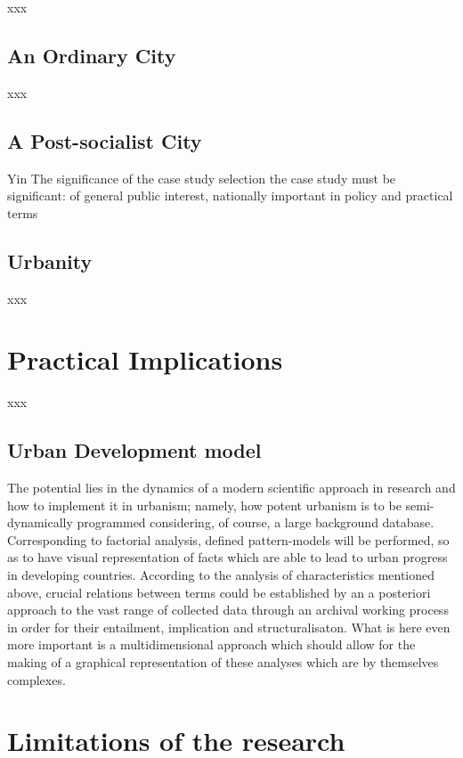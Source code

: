 \documentclass[11pt]{report}
\begin{document}
xxx

\subsection{An Ordinary City}

xxx

\subsection{A Post-socialist City}

Yin
The significance of the case study selection
the case study must be significant: of general public interest, nationally important in policy and practical terms

\subsection{Urbanity}

xxx

\section{Practical Implications}

xxx

\subsection{Urban Development model}

The potential lies in the dynamics of a modern scientific approach in research and how to implement it in urbanism; namely, how potent urbanism is to be semi-dynamically programmed considering, of course, a large background database. 
Corresponding to factorial analysis, defined pattern-models will be performed, so as to have visual representation of facts which are able to lead to urban progress in developing countries.
According to the analysis of characteristics mentioned above, crucial relations between terms could be established by an a posteriori approach to the vast range of collected data through an archival working process in order for their entailment, implication and structuralisaton.
What is here even more important is a multidimensional approach which should allow for the making of a graphical representation of these analyses which are by themselves complexes.

\section{Limitations of the research}
\end{document}
